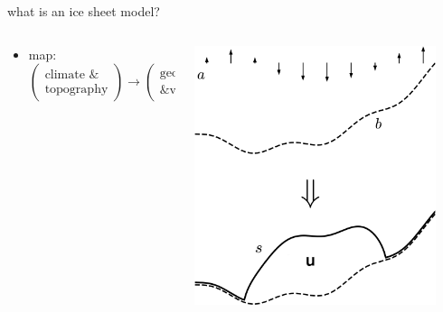 \documentclass[svgnames,
               hyperref={colorlinks,citecolor=DeepPink4,linkcolor=FireBrick,urlcolor=Maroon},
               usepdftitle=false]  %
               {beamer}
\begin{document}
\begin{frame}{what is an ice sheet model?}
\begin{columns}
\begin{column}{0.6\textwidth}
\begin{itemize}
\smallskip
\item<2-> {\small map: \quad $\begin{pmatrix} \text{climate \&} \\ \text{topography} \end{pmatrix} \to \begin{pmatrix} \text{geometry} \\ \text{\& velocity} \end{pmatrix}$}
\end{itemize}
\end{column}
\begin{column}{0.42\textwidth}
\hfill \includegraphics[width=0.9\textwidth]{images/map-velocity.png}

\vspace{2mm}
\end{column}
\end{columns}
\end{frame}
\end{document}

